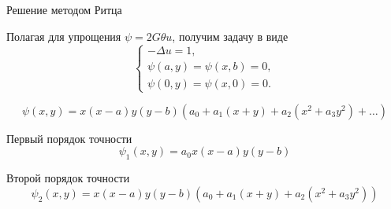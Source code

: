 \documentclass[ignoreonframetext,unicode]{beamer}
\begin{document}
\begin{frame}{Решение методом Ритца}
		\begin{block}{Полагая для упрощения $\psi = 2G \theta u$, получим задачу в виде}	
\[
\begin{cases}
	-\Delta u = 1, \\
	\psi(a, y) =  \psi(x,b) = 0, \\
	\psi(0, y) =  \psi(x,0) = 0.
\end{cases}
\]
	\end{block}

\begin{block}{}	
	\[
	\psi(x, y) = x(x - a)y(y - b)\left(a_0 + a_1\left(x + y\right) + a_2\left(x^2 + a_3 y^2\right) + \ldots\right)
	\]
\end{block}

	\begin{block}{Первый порядок точности}	
		\[
			\psi_1(x, y) = a_0 x(x - a)y(y - b)
		\]
	\end{block}

	\begin{block}{Второй порядок точности}	
	\[
		\psi_2(x, y) = x(x - a)y(y - b)\left(a_0 + a_1\left(x + y\right) + a_2\left(x^2 + a_3 y^2\right)\right)
	\]
\end{block}

\end{frame}
\end{document}
